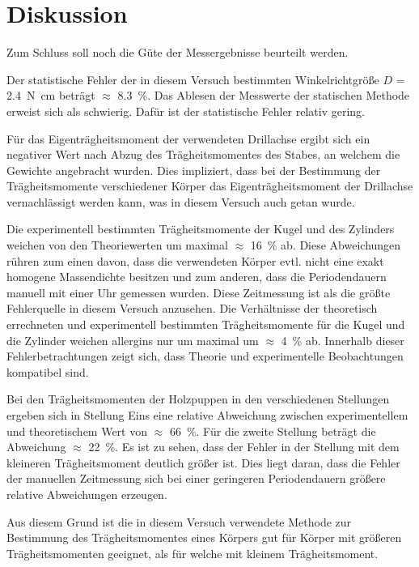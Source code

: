 
\section{Diskussion}
Zum Schluss soll noch die Güte der Messergebnisse beurteilt werden.

Der statistische Fehler der in diesem Versuch bestimmten Winkelrichtgröße 
$D$ = \SI{2.4}{\newton\centi\metre} beträgt $\approx$ \SI{8.3}{\percent}.
Das Ablesen der Messwerte der statischen Methode erweist sich als 
schwierig. Dafür ist der statistische Fehler relativ gering. 

Für das Eigenträgheitsmoment der verwendeten Drillachse ergibt sich 
ein negativer Wert nach Abzug des Trägheitsmomentes des Stabes, 
an welchem die Gewichte angebracht wurden. Dies impliziert, dass 
bei der Bestimmung der Trägheitsmomente verschiedener Körper 
das Eigenträgheitsmoment der Drillachse vernachlässigt werden kann,
 was in diesem Versuch auch getan wurde.

Die experimentell bestimmten Trägheitsmomente der Kugel und des 
Zylinders weichen von den Theoriewerten um maximal $\approx$ 
\SI{16}{\percent} ab. Diese Abweichungen rühren zum einen davon, 
dass die verwendeten Körper evtl. nicht eine exakt homogene 
Massendichte besitzen und zum anderen, dass die Periodendauern 
manuell mit einer Uhr gemessen wurden. Diese Zeitmessung ist als 
die größte Fehlerquelle in diesem Versuch anzusehen.
Die Verhältnisse der theoretisch errechneten und experimentell 
bestimmten Trägheitsmomente für die Kugel und die Zylinder 
weichen allergins nur um maximal um $\approx$ \SI{4}{\percent} ab.
Innerhalb dieser Fehlerbetrachtungen zeigt sich, dass Theorie 
und experimentelle Beobachtungen kompatibel sind.

Bei den Trägheitsmomenten der Holzpuppen in den verschiedenen 
Stellungen ergeben sich in Stellung Eins eine relative Abweichung 
zwischen experimentellem und theoretischem Wert von $\approx$ 
\SI{66}{\percent}. Für die zweite Stellung beträgt die Abweichung 
$\approx$ \SI{22}{\percent}.
Es ist zu sehen, dass der Fehler in der Stellung mit dem kleineren 
Trägheitsmoment deutlich größer ist. Dies liegt daran, dass die 
Fehler der manuellen Zeitmessung sich bei einer geringeren 
Periodendauern größere relative Abweichungen erzeugen.

Aus diesem Grund ist die in diesem Versuch verwendete Methode 
zur Bestimmung des Trägheitsmomentes eines Körpers gut für 
Körper mit größeren Trägheitsmomenten geeignet, als für welche 
mit kleinem Trägheitsmoment.